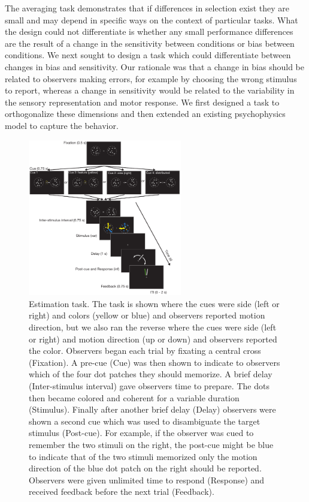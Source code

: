 The averaging task demonstrates that if differences in selection exist they are small and may depend in specific ways on the context of particular tasks. What the design could not differentiate is whether any small performance differences are the result of a change in the sensitivity between conditions or bias between conditions. We next sought to design a task which could differentiate between changes in bias and sensitivity. Our rationale was that a change in bias should be related to observers making errors, for example by choosing the wrong stimulus to report, whereas a change in sensitivity would be related to the variability in the sensory representation and motor response. We first designed a task to orthogonalize these dimensions and then extended an existing psychophysics model to capture the behavior. 

\begin{figure}
\centering
\includegraphics[keepaspectratio,width=0.6\textwidth]{figs_c4/f4_estimationtask.pdf}
\caption[Estimation task]{Estimation task. The task is shown where the cues were side (left or right) and colors (yellow or blue) and observers reported motion direction, but we also ran the reverse where the cues were side (left or right) and motion direction (up or down) and observers reported the color. Observers began each trial by fixating a central cross (Fixation). A pre-cue (Cue) was then shown to indicate to observers which of the four dot patches they should memorize. A brief delay (Inter-stimulus interval) gave observers time to prepare. The dots then became colored and coherent for a variable duration (Stimulus). Finally after another brief delay (Delay) observers were shown a second cue which was used to disambiguate the target stimulus (Post-cue). For example, if the observer was cued to remember the two stimuli on the right, the post-cue might be blue to indicate that of the two stimuli memorized only the motion direction of the blue dot patch on the right should be reported. Observers were given unlimited time to respond (Response) and received feedback before the next trial (Feedback).}
\label{fig:c4f4}
\end{figure}

